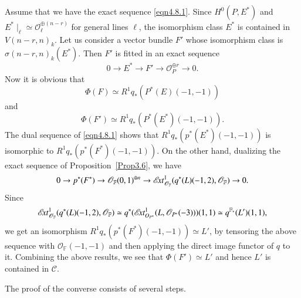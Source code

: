 \begin{Proof}
Assume that we have the exact sequence \eqref{eqn4.8.1}. Since
$H^{0}(P,E^{\ast})$ and $E^{\ast}\mid_{\ell}\simeq \mathscr{O}^{\oplus
  (n-r)}_{\ell}$ for general lines $\ell$, the isomorphism class
$E^{\ast}$ is contained in $V(n-r, n)_k$. Let us consider a vector
bundle $F'$ whose isomorphism class is
$\sigma(n-r,n)_k(E^{\ast})$. Then $F'$ is fitted in an exact sequence 
$$
0\to E^{\ast}\to F'\to \mathscr{O}^{\oplus r}_P\to 0.
$$
Now it is obvious that 
$$
\Phi(F)\simeq
R^{1}q_{\ast}(P^{\ast}(E)(-1,-1))
$$ 
and 
$$
\Phi(F')\simeq
R^{1}q_{\ast}(P^{\ast}(E^{\ast})(-1,-1)).
$$ 
The dual sequence of
\eqref{eqn4.8.1} shows that $R^{1}q_{\ast}(p^{\ast}(E^{\ast})(-1,-1))$
is isomorphic to $R^{1}q_{\ast}(p^{\ast}(F^{\ast})(-1,-1))$. On the
other hand, dualizing the exact sequence of Proposition~\ref{Prop3.6},
we have 
\begin{equation}\label{eqn4.8.2}
0\to p^{\ast}(F^{\ast})\to \mathscr{O}_{\mathbb{F}}(0,1)^{\oplus n}\to
\mathscr{E}\!{\it xt}^{1}_{\mathscr{O}_{\mathbb{F}}}(q^{\ast}(L)(-1,2),\mathscr{O}_{\mathbb{F}})\to 0.
\end{equation}
\pageoriginale
Since
$$\mathscr{E}\!{\it xt}^{1}_{\mathscr{O}_{\mathbb{F}}}(q^{\ast}(L)(-1,2), \mathscr{O}_{\mathbb{F}})\simeq
q^{\ast}(\mathscr{E}\!{\it xt}^{1}_{O_{P^{\ast}}}(L,\mathscr{O}_{P^{\ast}}(-3)))(1,1)\simeq
q^{\mathbb{F}_{\ast}}(L')(1,1),
$$ 
we get an isomorphism
$R^{1}q_{\ast}(p^{\ast}(F^{\ast})(-1,-1))\simeq L'$, by tensoring the
above sequence with $\mathscr{O}_{\mathbb{F}}(-1,-1)$ and then
applying the direct image functor of $q$ to it. Combining the above
results, we see that $\Phi(F')\simeq L'$ and hence $L'$ is contained
in $\mathscr{C}$. 

The proof of the converse consists of several steps. 


\end{Proof}
